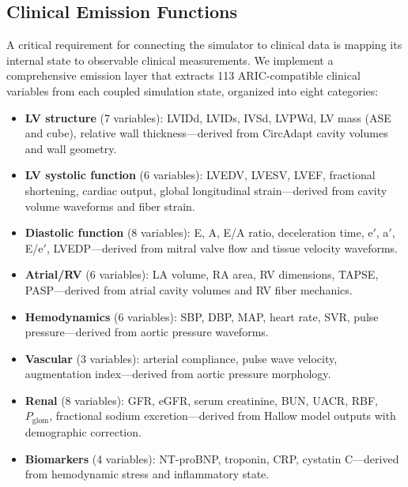 \documentclass[pmlr]{jmlr}
\begin{document}
\subsection{Clinical Emission Functions}
\label{sec:emission}

A critical requirement for connecting the simulator to clinical data is mapping its internal state to observable clinical measurements. We implement a comprehensive emission layer that extracts 113 ARIC-compatible clinical variables from each coupled simulation state, organized into eight categories:

\begin{itemize}
\item \textbf{LV structure} (7 variables): LVIDd, LVIDs, IVSd, LVPWd, LV mass (ASE and cube), relative wall thickness---derived from CircAdapt cavity volumes and wall geometry.

\item \textbf{LV systolic function} (6 variables): LVEDV, LVESV, LVEF, fractional shortening, cardiac output, global longitudinal strain---derived from cavity volume waveforms and fiber strain.

\item \textbf{Diastolic function} (8 variables): E, A, E/A ratio, deceleration time, e$'$, a$'$, E/e$'$, LVEDP---derived from mitral valve flow and tissue velocity waveforms.

\item \textbf{Atrial/RV} (6 variables): LA volume, RA area, RV dimensions, TAPSE, PASP---derived from atrial cavity volumes and RV fiber mechanics.

\item \textbf{Hemodynamics} (6 variables): SBP, DBP, MAP, heart rate, SVR, pulse pressure---derived from aortic pressure waveforms.

\item \textbf{Vascular} (3 variables): arterial compliance, pulse wave velocity, augmentation index---derived from aortic pressure morphology.

\item \textbf{Renal} (8 variables): GFR, eGFR, serum creatinine, BUN, UACR, RBF, $P_{\text{glom}}$, fractional sodium excretion---derived from Hallow model outputs with demographic correction.

\item \textbf{Biomarkers} (4 variables): NT-proBNP, troponin, CRP, cystatin C---derived from hemodynamic stress and inflammatory state.%
\end{itemize}
\end{document}

